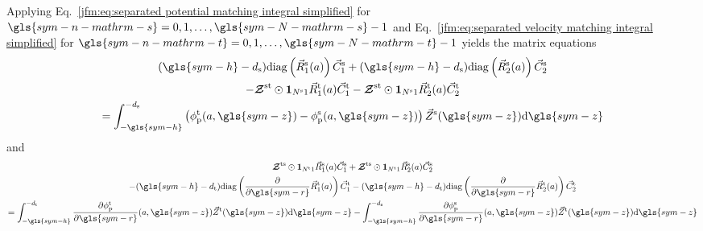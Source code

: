 \documentclass[ASNA,twocolumn]{USG} %
\begin{document}
Applying Eq.~\ref{jfm:eq:separated potential matching integral simplified} for $\gls{sym-n-mathrm-s}=0,1,\dots, \gls{sym-N-mathrm-s}-1$ and Eq.~\ref{jfm:eq:separated velocity matching integral simplified} for $\gls{sym-n-mathrm-t}=0,1,\dots, \gls{sym-N-mathrm-t}-1$ yields the matrix equations
\begin{multline}\label{jfm:eq:potential matching vector equations}
    (\gls{sym-h}-d_\mathrm{s})\mathrm{diag}
        \left(
            \vec{R}_{1}^\mathrm{s}(a)
        \right)
        \vec{C}_{1}^\mathrm{s}  + 
    (\gls{sym-h}-d_\mathrm{s})\mathrm{diag}
        \left(
            \vec{R}_{2}^\mathrm{s}(a)
        \right)
        \vec{C}_{2}^\mathrm{s}
    \\
    - \boldsymbol{\mathcal{Z}}^{\mathrm{st}} \odot \boldsymbol{1}_{N^\mathrm{s}1} \vec{R}_{1}^\mathrm{t}(a)\vec{C}_1^\mathrm{t}
    - \boldsymbol{\mathcal{Z}}^{\mathrm{st}} \odot \boldsymbol{1}_{N^\mathrm{s}1} \vec{R}_{2}^\mathrm{t}(a)\vec{C}_2^\mathrm{t}
    \\
    =\int_{-\gls{sym-h}}^{-d_\mathrm{s}}
        \left(
            \phi_\mathrm{p}^\mathrm{t}(a,\gls{sym-z}) -
            \phi_\mathrm{p}^\mathrm{s}(a,\gls{sym-z})
        \right)
        \vec{Z}^\mathrm{s}(\gls{sym-z})
        \mathrm{d}\gls{sym-z}
\end{multline}
and
\begin{multline}\label{jfm:eq:velocity matching vector equations}
    \boldsymbol{\mathcal{Z}}^\mathrm{ts} \odot \mathbf{1}_{N^\mathrm{t}1}\vec{R}_1^\mathrm{s}(a)\vec{C}_1^\mathrm{s} +
    \boldsymbol{\mathcal{Z}}^\mathrm{ts} \odot \mathbf{1}_{N^\mathrm{t}1}\vec{R}_2^\mathrm{s}(a)\vec{C}_2^\mathrm{s}
    \\ 
    -(\gls{sym-h}-d_\mathrm{t})\mathrm{diag}
        \left(
            \frac{\partial}{\partial \gls{sym-r}} \vec{R}_1^\mathrm{t}(a)
        \right)
        \vec{C}_1^\mathrm{t} -(\gls{sym-h}-d_\mathrm{t})\mathrm{diag}
        \left(
            \frac{\partial}{\partial \gls{sym-r}} \vec{R}_2^\mathrm{t}(a)
        \right)
        \vec{C}_2^\mathrm{t}
    \\ =
    \int_{-\gls{sym-h}}^{-d_\mathrm{t}}
        \frac{
                \partial \phi_\mathrm{p}^\mathrm{t}
            }
            {
                \partial \gls{sym-r}
            }(a,\gls{sym-z})
        \vec{Z}^\mathrm{t}{}(\gls{sym-z}) \mathrm{d}\gls{sym-z}
    -\int_{-\gls{sym-h}}^{-d_\mathrm{s}}
        \frac{
                \partial \phi_\mathrm{p}^\mathrm{s}
            }
            {
                \partial \gls{sym-r}
            }(a,\gls{sym-z})
        \vec{Z}^\mathrm{t}{}(\gls{sym-z}) \mathrm{d}\gls{sym-z}
\end{multline}
\end{document}
